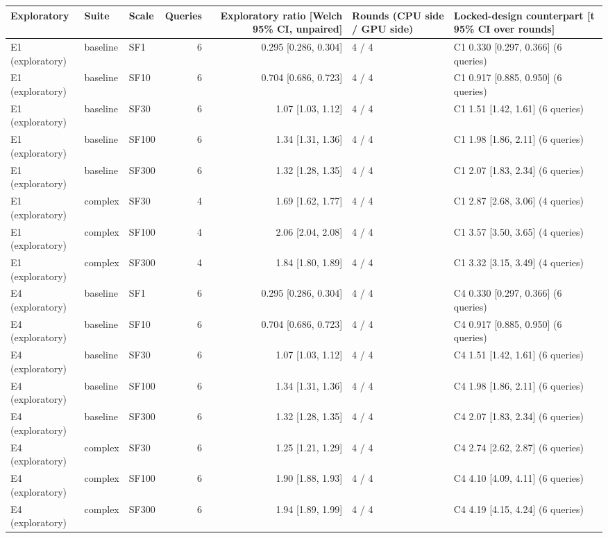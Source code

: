 \begin{longtable}{lllrrll}
\toprule
Exploratory & Suite & Scale & Queries & Exploratory ratio [Welch 95\% CI, unpaired] & Rounds (CPU side / GPU side) & Locked-design counterpart [t 95\% CI over rounds] \\
\midrule
\endhead
\bottomrule
\endfoot
E1 (exploratory) & baseline & SF1 & 6 & 0.295 [0.286, 0.304] & 4 / 4 & C1 0.330 [0.297, 0.366] (6 queries) \\
E1 (exploratory) & baseline & SF10 & 6 & 0.704 [0.686, 0.723] & 4 / 4 & C1 0.917 [0.885, 0.950] (6 queries) \\
E1 (exploratory) & baseline & SF30 & 6 & 1.07 [1.03, 1.12] & 4 / 4 & C1 1.51 [1.42, 1.61] (6 queries) \\
E1 (exploratory) & baseline & SF100 & 6 & 1.34 [1.31, 1.36] & 4 / 4 & C1 1.98 [1.86, 2.11] (6 queries) \\
E1 (exploratory) & baseline & SF300 & 6 & 1.32 [1.28, 1.35] & 4 / 4 & C1 2.07 [1.83, 2.34] (6 queries) \\
E1 (exploratory) & complex & SF30 & 4 & 1.69 [1.62, 1.77] & 4 / 4 & C1 2.87 [2.68, 3.06] (4 queries) \\
E1 (exploratory) & complex & SF100 & 4 & 2.06 [2.04, 2.08] & 4 / 4 & C1 3.57 [3.50, 3.65] (4 queries) \\
E1 (exploratory) & complex & SF300 & 4 & 1.84 [1.80, 1.89] & 4 / 4 & C1 3.32 [3.15, 3.49] (4 queries) \\
E4 (exploratory) & baseline & SF1 & 6 & 0.295 [0.286, 0.304] & 4 / 4 & C4 0.330 [0.297, 0.366] (6 queries) \\
E4 (exploratory) & baseline & SF10 & 6 & 0.704 [0.686, 0.723] & 4 / 4 & C4 0.917 [0.885, 0.950] (6 queries) \\
E4 (exploratory) & baseline & SF30 & 6 & 1.07 [1.03, 1.12] & 4 / 4 & C4 1.51 [1.42, 1.61] (6 queries) \\
E4 (exploratory) & baseline & SF100 & 6 & 1.34 [1.31, 1.36] & 4 / 4 & C4 1.98 [1.86, 2.11] (6 queries) \\
E4 (exploratory) & baseline & SF300 & 6 & 1.32 [1.28, 1.35] & 4 / 4 & C4 2.07 [1.83, 2.34] (6 queries) \\
E4 (exploratory) & complex & SF30 & 6 & 1.25 [1.21, 1.29] & 4 / 4 & C4 2.74 [2.62, 2.87] (6 queries) \\
E4 (exploratory) & complex & SF100 & 6 & 1.90 [1.88, 1.93] & 4 / 4 & C4 4.10 [4.09, 4.11] (6 queries) \\
E4 (exploratory) & complex & SF300 & 6 & 1.94 [1.89, 1.99] & 4 / 4 & C4 4.19 [4.15, 4.24] (6 queries) \\
\end{longtable}
